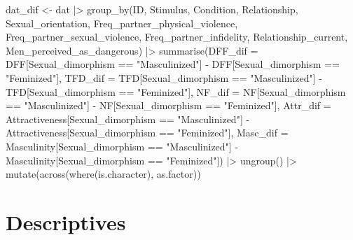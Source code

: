 \documentclass[
  bookmarksnumbered]{article}
\newenvironment{Shaded}{\begin{snugshade}}{\end{snugshade}}
\newcommand{\AttributeTok}[1]{\textcolor[rgb]{0.80,0.80,0.80}{#1}}
\newcommand{\FunctionTok}[1]{\textcolor[rgb]{0.94,0.94,0.56}{#1}}
\newcommand{\NormalTok}[1]{\textcolor[rgb]{0.80,0.80,0.80}{#1}}
\newcommand{\OtherTok}[1]{\textcolor[rgb]{0.94,0.94,0.56}{#1}}
\newcommand{\SpecialCharTok}[1]{\textcolor[rgb]{0.86,0.64,0.64}{#1}}
\newcommand{\StringTok}[1]{\textcolor[rgb]{0.80,0.58,0.58}{#1}}
\begin{document}
\begin{Shaded}
\begin{Highlighting}[]
\NormalTok{dat\_dif }\OtherTok{\textless{}{-}}\NormalTok{ dat }\SpecialCharTok{|\textgreater{}} 
  \FunctionTok{group\_by}\NormalTok{(ID, }
\NormalTok{           Stimulus, }
\NormalTok{           Condition, }
\NormalTok{           Relationship,}
\NormalTok{           Sexual\_orientation,}
\NormalTok{           Freq\_partner\_physical\_violence,}
\NormalTok{           Freq\_partner\_sexual\_violence,}
\NormalTok{           Freq\_partner\_infidelity,}
\NormalTok{           Relationship\_current,}
\NormalTok{           Men\_perceived\_as\_dangerous) }\SpecialCharTok{|\textgreater{}} 
  \FunctionTok{summarise}\NormalTok{(}\AttributeTok{DFF\_dif =}\NormalTok{ DFF[Sexual\_dimorphism }\SpecialCharTok{==} \StringTok{"Masculinized"}\NormalTok{] }\SpecialCharTok{{-}} 
\NormalTok{              DFF[Sexual\_dimorphism }\SpecialCharTok{==} \StringTok{"Feminized"}\NormalTok{],}
            \AttributeTok{TFD\_dif =}\NormalTok{ TFD[Sexual\_dimorphism }\SpecialCharTok{==} \StringTok{"Masculinized"}\NormalTok{] }\SpecialCharTok{{-}} 
\NormalTok{              TFD[Sexual\_dimorphism }\SpecialCharTok{==} \StringTok{"Feminized"}\NormalTok{],}
            \AttributeTok{NF\_dif =}\NormalTok{ NF[Sexual\_dimorphism }\SpecialCharTok{==} \StringTok{"Masculinized"}\NormalTok{] }\SpecialCharTok{{-}} 
\NormalTok{              NF[Sexual\_dimorphism }\SpecialCharTok{==} \StringTok{"Feminized"}\NormalTok{],}
            \AttributeTok{Attr\_dif =}\NormalTok{ Attractiveness[Sexual\_dimorphism }\SpecialCharTok{==} \StringTok{"Masculinized"}\NormalTok{] }\SpecialCharTok{{-}} 
\NormalTok{              Attractiveness[Sexual\_dimorphism }\SpecialCharTok{==} \StringTok{"Feminized"}\NormalTok{],}
            \AttributeTok{Masc\_dif =}\NormalTok{ Masculinity[Sexual\_dimorphism }\SpecialCharTok{==} \StringTok{"Masculinized"}\NormalTok{] }\SpecialCharTok{{-}} 
\NormalTok{              Masculinity[Sexual\_dimorphism }\SpecialCharTok{==} \StringTok{"Feminized"}\NormalTok{]) }\SpecialCharTok{|\textgreater{}} 
  \FunctionTok{ungroup}\NormalTok{() }\SpecialCharTok{|\textgreater{}} 
  \FunctionTok{mutate}\NormalTok{(}\FunctionTok{across}\NormalTok{(}\FunctionTok{where}\NormalTok{(is.character), as.factor))}
\end{Highlighting}
\end{Shaded}

\section{Descriptives}\label{descriptives}
\end{document}
